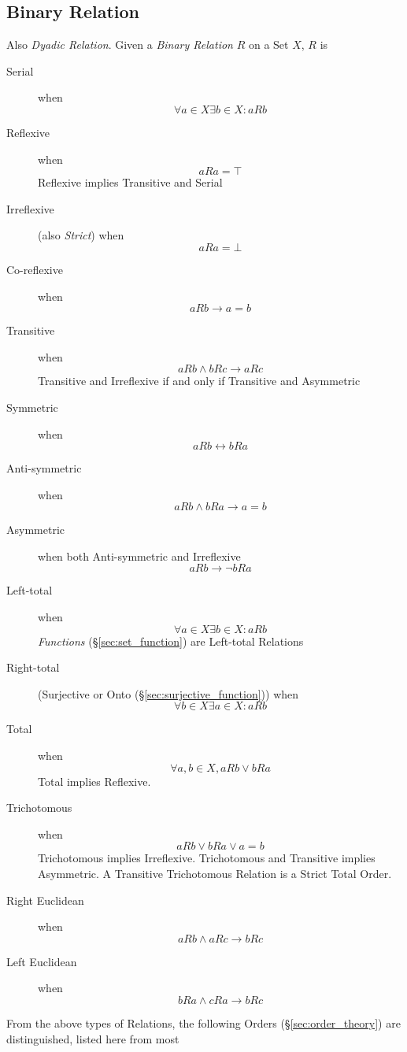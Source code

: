 \subsection{Binary Relation}\label{sec:binary_relation}

Also \emph{Dyadic Relation}. Given a \emph{Binary Relation} $R$ on a
Set $X$, $R$ is
\begin{description}
\item[Serial] when
\[
    \forall a \in X \exists b \in X : aRb
\]
\item[Reflexive] when
\[
    aRa = \top
\]
Reflexive implies Transitive and Serial
\item[Irreflexive] (also \emph{Strict}) when
\[
    aRa = \bot
\]
\item[Co-reflexive] when
\[
    aRb \rightarrow a = b
\]
\item[Transitive] when
\[
    aRb \wedge bRc \rightarrow aRc
\]
Transitive and Irreflexive if and only if Transitive and Asymmetric
\item[Symmetric] when
\[
    aRb \leftrightarrow bRa
\]
\item[Anti-symmetric] when
\[
    aRb \wedge bRa \rightarrow a = b
\]
\item[Asymmetric] when both Anti-symmetric and Irreflexive
\[
    aRb \rightarrow \neg bRa
\]
\item[Left-total] when
\[
    \forall a \in X \exists b \in X : aRb
\]
\emph{Functions} (\S\ref{sec:set_function}) are Left-total Relations
\item[Right-total] (Surjective or Onto
  (\S\ref{sec:surjective_function})) when
\[
    \forall b \in X \exists a \in X : aRb
\]
\item[Total] when
\[
    \forall a,b \in X, aRb \vee bRa
\]
Total implies Reflexive.
\item[Trichotomous] when
\[
    aRb \vee bRa \vee a = b
\]
Trichotomous implies Irreflexive.
Trichotomous and Transitive implies Asymmetric.
A Transitive Trichotomous Relation is a Strict Total Order.
\item[Right Euclidean] when
\[
    aRb \wedge aRc \rightarrow bRc
\]
\item[Left Euclidean] when
\[
    bRa \wedge cRa \rightarrow bRc
\]
\end{description}
From the above types of Relations, the following Orders
(\S\ref{sec:order_theory}) are distinguished, listed here from most
